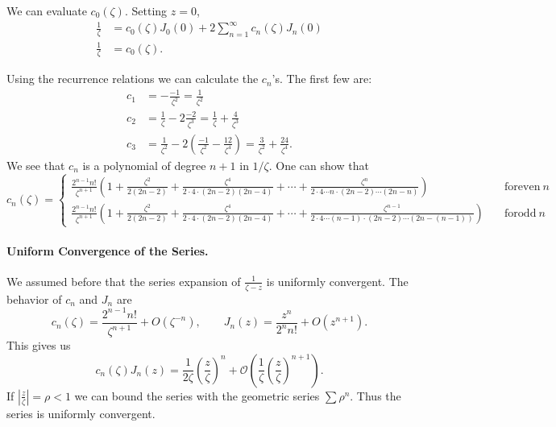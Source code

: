 We can evaluate $c_0(\zeta)$.  Setting $z = 0$, 
\begin{align*}
  \frac{1}{\zeta} &= c_0(\zeta) J_0(0) + 2 \sum_{n = 1}^\infty c_n(\zeta) J_n(0) 
  \\
  \frac{1}{\zeta} &= c_0(\zeta).
\end{align*}

Using the recurrence relations we can calculate the $c_n$'s.  The first few
are:
\begin{align*}
  c_1 &= - \frac{-1}{\zeta^2} = \frac{1}{\zeta^2} 
  \\
  c_2 &= \frac{1}{\zeta} - 2 \frac{-2}{\zeta^3} = \frac{1}{\zeta} 
  + \frac{4}{\zeta^3} 
  \\
  c_3 &= \frac{1}{\zeta^2} - 2 \left( \frac{-1}{\zeta^2} - \frac{12}{\zeta^4}
  \right) = \frac{3}{\zeta^2} + \frac{24}{\zeta^4}.
\end{align*}
We see that $c_n$ is a polynomial of degree $n+1$ in $1/\zeta$. One can show
that
\[ c_n(\zeta) = \begin{cases}
  \frac{2^{n-1} n!}{\zeta^{n+1}} \left( 1 + \frac{\zeta^2}{2(2n-2)}
    + \frac{\zeta^4}{2\cdot 4 \cdot (2n-2)(2n-4)} + \cdots + 
    \frac{\zeta^n}{2\cdot 4 \cdots n \cdot (2n-2)\cdots (2n-n)}
  \right)
  \quad &\mathrm{for even}\ n 
  \\
  \frac{2^{n-1} n!}{\zeta^{n+1}} \left( 1 + \frac{\zeta^2}{2(2n-2)}
    + \frac{\zeta^4}{2\cdot 4 \cdot (2n-2)(2n-4)} + \cdots + 
    \frac{\zeta^{n-1}}
    {2\cdot 4 \cdots (n-1) \cdot (2n-2)\cdots (2n-(n-1))}\right)
  \quad &\mathrm{for odd}\ n 
\end{cases}
\]



\paragraph{Uniform Convergence of the Series.}
We assumed before that the series expansion of $\frac{1}{\zeta-z}$ is
uniformly convergent.  The behavior of $c_n$ and $J_n$ are
\[ 
c_n(\zeta) = \frac{2^{n-1} n!}{\zeta^{n+1}} + O(\zeta^{-n}), \qquad
J_n(z) = \frac{z^n}{2^n n!} + O(z^{n+1}). 
\]
This gives us
\[ 
c_n(\zeta)J_n(z) = \frac{1}{2\zeta} \left(\frac{z}{\zeta}\right)^n
+ \mathcal{O}\left( \frac{1}{\zeta} \left( \frac{z}{\zeta}\right)^{n+1}\right).
\]
If $\left| \frac{z}{\zeta}\right| = \rho < 1$ we can bound the series
with the geometric series $\sum \rho^n$.  Thus the series is uniformly 
convergent.



